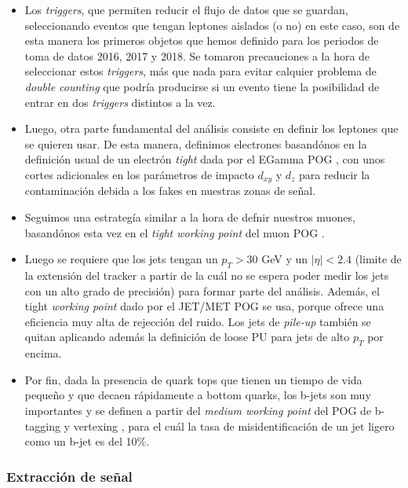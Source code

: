 \documentclass[a4paper, 10pt, openright]{report}
\begin{document}
\begin{appendices}
\begin{itemize}
\item Los \textit{triggers}, que permiten reducir el flujo de datos que se guardan, seleccionando eventos que tengan leptones aislados (o no) en este caso, son de esta manera los primeros objetos que hemos definido para los periodos de toma de datos 2016, 2017 y 2018. Se tomaron precauciones a la hora de seleccionar estos \textit{triggers}, m\'{a}s que nada para evitar calquier problema de \textit{double counting} que podr\'{i}a producirse si un evento tiene la posibilidad de entrar en dos \textit{triggers} distintos a la vez. 
\item Luego, otra parte fundamental del an\'{a}lisis consiste en definir los leptones que se quieren usar. De esta manera, definimos electrones basand\'{o}nos en la definici\'{o}n usual de un electr\'{o}n \textit{tight} dada por el EGamma \ac{POG} \cite{ElePOG}, con unos cortes adicionales en los par\'{a}metros de impacto $d_{xy}$ y $d_z$ para reducir la contaminaci\'{o}n debida a los fakes en nuestras zonas de se\~{n}al. 
\item Seguimos una estrateg\'{i}a similar a la hora de defnir nuestros muones, basand\'{o}nos esta vez en el \textit{tight working point} del muon \ac{POG} \cite{MuonPOG}. 
\item Luego se requiere que los jets tengan un $p_T > 30$ GeV y un $|\eta| < 2.4$ (limite de la extensi\'{o}n del tracker a partir de la cu\'{a}l no se espera poder medir los jets con un alto grado de precisi\'{o}n) para formar parte del an\'{a}lisis. Adem\'{a}s, el tight \textit{working point} dado por el JET/MET \ac{POG} \cite{JETMETPOG} se usa, porque ofrece una eficiencia muy alta de rejecci\'{o}n del ruido. Los jets de \textit{pile-up} tambi\'{e}n se quitan aplicando adem\'{a}s la definici\'{o}n de loose \ac{PU} para jets de alto $p_T$ por encima.
\item Por fin, dada la presencia de quark tops que tienen un tiempo de vida peque\~{n}o y que decaen r\'{a}pidamente a bottom quarks, los b-jets son muy importantes y se definen a partir del \textit{medium working point} del \ac{POG} de b-tagging y vertexing \cite{BTagPOG}, para el cu\'{a}l la tasa de misidentificaci\'{o}n de un jet ligero como un b-jet es del 10\%.
\end{itemize}

\subsubsection{Extracci\'{o}n de se\~{n}al}


\end{appendices}
\end{document}
